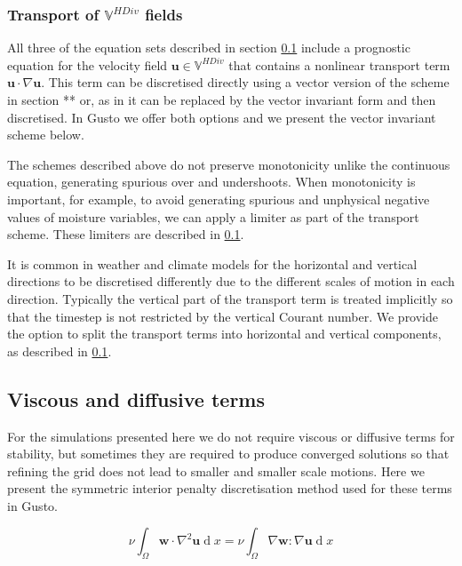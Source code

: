 \documentclass[journal abbreviation, manuscript]{copernicus}
\def\MM#1{\boldsymbol{#1}}
\DeclareMathOperator{\diff}{d}
\begin{document}
\subsubsection{Transport of $\mathbb{V}^{HDiv}$ fields}
All three of the equation sets described in section \ref{} include a
prognostic equation for the velocity field
$\MM{u}\in\mathbb{V}^{HDiv}$ that contains a nonlinear transport term
$\MM{u}\cdot\nabla\MM{u}$. This term can be discretised directly using
a vector version of the scheme in section ** or, as in \citet{} it can
be replaced by the vector invariant form and then discretised. In
Gusto we offer both options and we present the vector invariant scheme
below.



The schemes described above do not preserve monotonicity unlike the
continuous equation, generating spurious over and undershoots. When
monotonicity is important, for example, to avoid generating spurious
and unphysical negative values of moisture variables, we can apply a
limiter as part of the transport scheme. These limiters are described
in \ref{}.

It is common in weather and climate models for the horizontal and
vertical directions to be discretised differently due to the different
scales of motion in each direction. Typically the vertical part of the
transport term is treated implicitly so that the timestep is not
restricted by the vertical Courant number. We provide the option to
split the transport terms into horizontal and vertical components, as
described in \ref{}.

\subsection{Viscous and diffusive terms}

For the simulations presented here we do not require viscous or
diffusive terms for stability, but sometimes they are required to
produce converged solutions so that refining the grid does not
lead to smaller and smaller scale motions. Here we present the symmetric
interior penalty discretisation method used for these terms in Gusto.

\begin{equation}
  \nu\int_\Omega\MM{w}\cdot\nabla^2\MM{u}\diff x = \nu\int_\Omega\nabla\MM{w}:\nabla\MM{u}\diff x
\end{equation}
\end{document}

